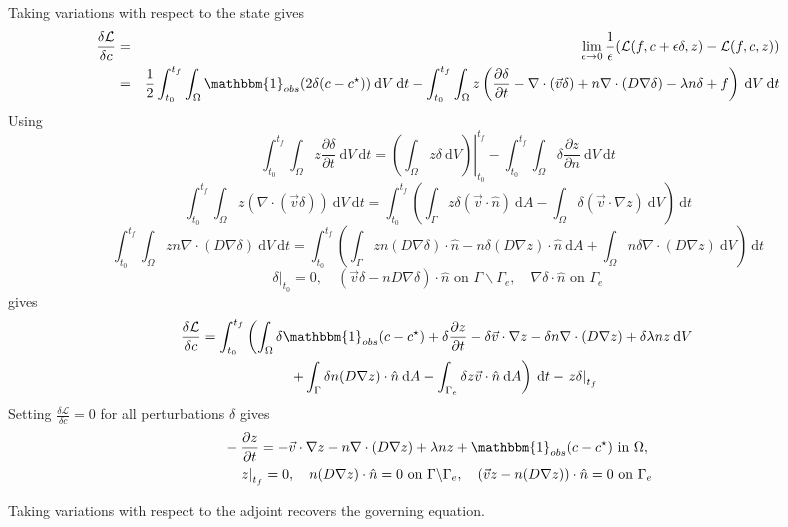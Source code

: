 \documentclass[12pt, letterpaper]{article}
\newcommand{\dA}{{\:\textrm{d}A}}
\newcommand{\dV}{{\:\textrm{d}V}}
\newcommand{\dt}{{\:\textrm{d}t}}
\begin{document}
Taking variations with respect to the state gives
\begin{eqnarray*}
\frac{\delta\mathcal{L}}{\delta c} &=& \lim_{\epsilon\to0}\frac{1}{\epsilon}(\mathcal{L}(f,c+\epsilon\delta,z)-\mathcal{L}(f,c,z)) \\
&=& \frac{1}{2}\int_{t_0}^{t_f}\int_\Omega\mathbbm{1}_{obs}(2\delta (c-c^\star)) \dV\dt - \int_{t_0}^{t_f}\int_\Omega z\left(\frac{\partial \delta}{\partial t}-\nabla\cdot(\vec{v}\delta)+n\nabla\cdot (D\nabla \delta)-\lambda n \delta + f\right)\dV\dt
\end{eqnarray*}
Using
\[
\int_{t_0}^{t_f}\int_\Omega z\frac{\partial\delta}{\partial t} \dV\dt=\left.\left(\int_\Omega z\delta \dV\right)\right\vert^{t_f}_{t_0}-\int_{t_0}^{t_f}\int_\Omega \delta\frac{\partial z}{\partial n}\dV\dt
\]
\[
\int_{t_0}^{t_f}\int_\Omega z(\nabla\cdot(\vec{v}\delta)) \dV\dt = \int_{t_0}^{t_f}\left(\int_\Gamma z\delta(\vec{v}\cdot\hat{n}) \dA -\int_\Omega \delta (\vec{v}\cdot\nabla z) \dV\right)\dt
\]
\[
\int_{t_0}^{t_f}\int_\Omega zn\nabla\cdot(D\nabla\delta) \dV\dt = \int_{t_0}^{t_f}\left(\int_\Gamma zn(D\nabla\delta)\cdot\hat{n}-n\delta(D\nabla z)\cdot\hat{n}\dA + \int_\Omega n\delta\nabla\cdot(D\nabla z) \dV\right)\dt
\]
\[
\left.\delta\right\vert_{t_0}=0,\quad (\vec{v}\delta-nD\nabla\delta)\cdot\hat{n}\textrm{ on }\Gamma\backslash\Gamma_e,\quad\nabla\delta\cdot\hat{n}\textrm{ on }\Gamma_e
\]
gives
\begin{multline*}
\frac{\delta\mathcal{L}}{\delta c} = \int_{t_0}^{t_f}\left(\int_\Omega \delta\mathbbm{1}_{obs}(c-c^\star)+\delta\frac{\partial z}{\partial t} - \delta\vec{v}\cdot\nabla z - \delta n \nabla\cdot(D\nabla z) + \delta\lambda nz \dV \right. \\
 \quad \left. + \int_\Gamma \delta n(D\nabla z)\cdot\hat{n} \dA - \int_{\Gamma_e} \delta z\vec{v}\cdot\hat{n} \dA\right)\dt -\left.z\delta\right\vert_{t_f}
\end{multline*}
Setting $\frac{\delta\mathcal{L}}{\delta c}=0$ for all perturbations $\delta$ gives
\begin{eqnarray*}
& -\frac{\partial z}{\partial t} = -\vec{v}\cdot\nabla z - n\nabla\cdot(D\nabla z) + \lambda nz + \mathbbm{1}_{obs}(c-c^\star)\textrm{ in }\Omega,\\
& \quad \left.z\right\vert_{t_f}=0,
\quad n(D\nabla z)\cdot\hat{n}=0\textrm{ on }\Gamma\backslash\Gamma_e,
\quad (\vec{v}z-n(D\nabla z))\cdot\hat{n} = 0\textrm{ on }\Gamma_e
\end{eqnarray*}

Taking variations with respect to the adjoint recovers the governing equation.
\end{document}
